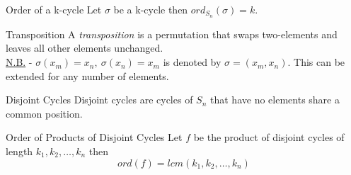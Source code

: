 \documentclass[11pt,a4paper]{article}
\begin{document}
\subtitle{Theorem 13.04 - }{Order of a k-cycle}
Let $\sigma$ be a k-cycle then $ord_{S_n}(\sigma) = k$.\\

\subtitle{Definition 13.05 - }{Transposition}
A \textit{transposition} is a permutation that swaps two-elements and leaves all other elements unchanged.\\
\underline{N.B.} - $\sigma(x_m) = x_n,\ \sigma(x_n) = x_m$ is denoted by $\sigma = (x_m, x_n)$. This can be extended for any number of elements.\\

\subtitle{Definition 13.06 - }{Disjoint Cycles}
Disjoint cycles are cycles of $S_n$ that have no elements share a common position.\\

\subtitle{Theorem 13.07 - }{Order of Products of Disjoint Cycles}
Let $f$ be the product of disjoint cycles of length $k_1, k_2, \dots , k_n$ then
$$ord(f) = lcm(k_1, k_2, \dots , k_n)$$
\end{document}
